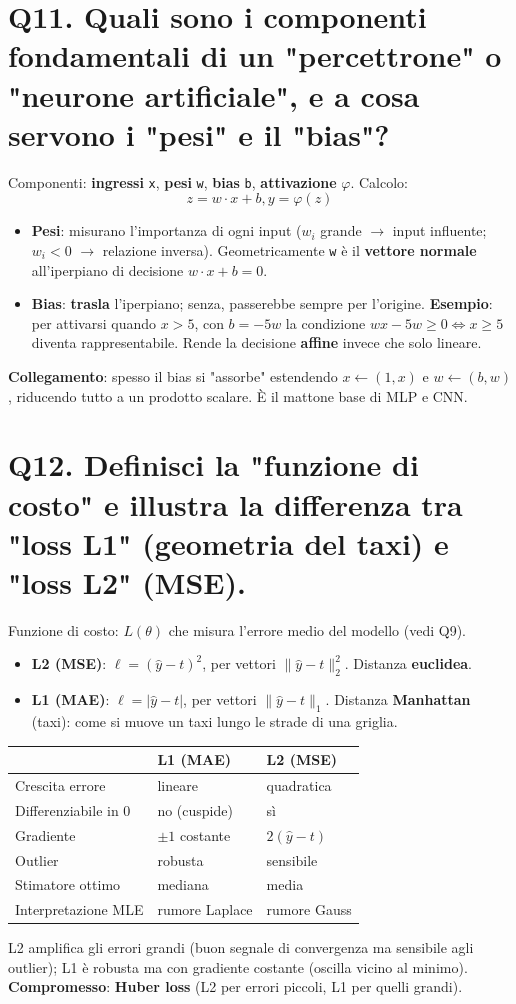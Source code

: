 \documentclass[11pt,a4paper]{article}
\begin{document}
\section*{Q11. Quali sono i componenti fondamentali di un "percettrone" o "neurone artificiale", e a cosa servono i "pesi" e il "bias"?}
Componenti: \textbf{ingressi} \texttt{x}, \textbf{pesi} \texttt{w}, \textbf{bias} \texttt{b}, \textbf{attivazione} $\varphi $. Calcolo:
\[ z = w \cdot  x + b,   y = \varphi (z) \]
\begin{itemize}
\item \textbf{Pesi}: misurano l'importanza di ogni input ($w_{i}$ grande $\to $ input influente; $w_{i}<0$ $\to $ relazione inversa). Geometricamente \texttt{w} è il \textbf{vettore normale} all'iperpiano di decisione $w\cdot x+b=0$.
\item \textbf{Bias}: \textbf{trasla} l'iperpiano; senza, passerebbe sempre per l'origine. \textbf{Esempio}: per attivarsi quando $x>5$, con $b=-5w$ la condizione $wx-5w\ge 0 \Leftrightarrow  x\ge 5$ diventa rappresentabile. Rende la decisione \textbf{affine} invece che solo lineare.
\end{itemize}
\textbf{Collegamento}: spesso il bias si "assorbe" estendendo $x \leftarrow  (1, x)$ e $w \leftarrow  (b, w)$, riducendo tutto a un prodotto scalare. È il mattone base di MLP e CNN.
\newpage
\section*{Q12. Definisci la "funzione di costo" e illustra la differenza tra "loss L1" (geometria del taxi) e "loss L2" (MSE).}
Funzione di costo: $L(\theta )$ che misura l'errore medio del modello (vedi Q9).
\begin{itemize}
\item \textbf{L2 (MSE)}: $\ell  = (\hat{y}-t)^{2}$, per vettori $\|\hat{y}-t\|_{2}^{2}$. Distanza \textbf{euclidea}.
\item \textbf{L1 (MAE)}: $\ell  = |\hat{y}-t|$, per vettori $\|\hat{y}-t\|_{1}$. Distanza \textbf{Manhattan} (taxi): come si muove un taxi lungo le strade di una griglia.
\end{itemize}
\begin{center}\renewcommand{\arraystretch}{1.25}
\begin{tabular}{|l|l|l|}\hline
\textbf{} & \textbf{L1 (MAE)} & \textbf{L2 (MSE)} \\ \hline
Crescita errore & lineare & quadratica \\ \hline
Differenziabile in 0 & no (cuspide) & sì \\ \hline
Gradiente & $\pm 1$ costante & $2(\hat{y}-t)$ \\ \hline
Outlier & robusta & sensibile \\ \hline
Stimatore ottimo & mediana & media \\ \hline
Interpretazione MLE & rumore Laplace & rumore Gauss \\ \hline
\end{tabular}\end{center}
L2 amplifica gli errori grandi (buon segnale di convergenza ma sensibile agli outlier); L1 è robusta ma con gradiente costante (oscilla vicino al minimo). \textbf{Compromesso}: \textbf{Huber loss} (L2 per errori piccoli, L1 per quelli grandi).
\newpage
\end{document}
